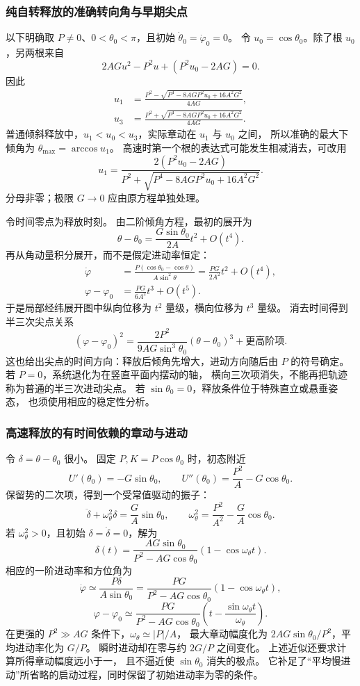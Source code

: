 \documentclass[UTF8,zihao=-4,fontset=fandol,a4paper]{ctexart}
\begin{document}
\subsubsection*{纯自转释放的准确转向角与早期尖点}
以下明确取 $P\ne0$、$0<\theta_0<\pi$，且初始
$\dot\theta_0=\dot\varphi_0=0$。
令 $u_0=\cos\theta_0$。除了根 $u_0$，另两根来自
\[
2AGu^2-P^2u+(P^2u_0-2AG)=0.
\]
因此
\[
\begin{aligned}
u_1&=\frac{P^2-\sqrt{P^4-8AGP^2u_0+16A^2G^2}}{4AG},\\
u_3&=\frac{P^2+\sqrt{P^4-8AGP^2u_0+16A^2G^2}}{4AG}.
\end{aligned}
\]
普通倾斜释放中，$u_1<u_0<u_3$，实际章动在 $u_1$ 与 $u_0$ 之间，
所以准确的最大下倾角为 $\theta_{\max}=\arccos u_1$。
高速时第一个根的表达式可能发生相减消去，可改用
\[
u_1=\frac{2(P^2u_0-2AG)}
{P^2+\sqrt{P^4-8AGP^2u_0+16A^2G^2}}.
\]
分母非零；极限 $G\to0$ 应由原方程单独处理。

令时间零点为释放时刻。
由二阶倾角方程，最初的展开为
\[
\theta-\theta_0=\frac{G\sin\theta_0}{2A}t^2+O(t^4).
\]
再从角动量积分展开，而不是假定进动率恒定：
\[
\begin{aligned}
\dot\varphi&=\frac{P(\cos\theta_0-\cos\theta)}{A\sin^2\theta}
=\frac{PG}{2A^2}t^2+O(t^4),\\
\varphi-\varphi_0&=\frac{PG}{6A^2}t^3+O(t^5).
\end{aligned}
\]
于是局部经纬展开图中纵向位移为 $t^2$ 量级，横向位移为 $t^3$ 量级。
消去时间得到半三次尖点关系
\[
(\varphi-\varphi_0)^2=
\frac{2P^2}{9AG\sin^3\theta_0}(\theta-\theta_0)^3
+\text{更高阶项}.
\]
这也给出尖点的时间方向：释放后倾角先增大，进动方向随后由 $P$ 的符号确定。
若 $P=0$，系统退化为在竖直平面内摆动的轴，
横向三次项消失，不能再把轨迹称为普通的半三次进动尖点。
若 $\sin\theta_0=0$，释放条件位于特殊直立或悬垂姿态，
也须使用相应的稳定性分析。

\subsubsection*{高速释放的有时间依赖的章动与进动}
令 $\delta=\theta-\theta_0$ 很小。
固定 $P,K=P\cos\theta_0$ 时，初态附近
\[
U'(\theta_0)=-G\sin\theta_0,\qquad
U''(\theta_0)=\frac{P^2}{A}-G\cos\theta_0.
\]
保留势的二次项，得到一个受常值驱动的振子：
\[
\ddot\delta+\omega_\theta^2\delta=\frac GA\sin\theta_0,
\qquad
\omega_\theta^2=\frac{P^2}{A^2}-\frac GA\cos\theta_0.
\]
若 $\omega_\theta^2>0$，且初始 $\delta=\dot\delta=0$，解为
\[
\delta(t)=\frac{AG\sin\theta_0}{P^2-AG\cos\theta_0}
(1-\cos\omega_\theta t).
\]
相应的一阶进动率和方位角为
\[
\dot\varphi\simeq\frac{P\delta}{A\sin\theta_0}
=\frac{PG}{P^2-AG\cos\theta_0}(1-\cos\omega_\theta t),
\]
\[
\varphi-\varphi_0\simeq\frac{PG}{P^2-AG\cos\theta_0}
\left(t-\frac{\sin\omega_\theta t}{\omega_\theta}\right).
\]
在更强的 $P^2\gg AG$ 条件下，$\omega_\theta\simeq|P|/A$，
最大章动幅度化为 $2AG\sin\theta_0/P^2$，平均进动率化为 $G/P$。
瞬时进动却在零与约 $2G/P$ 之间变化。
上述近似还要求计算所得章动幅度远小于一，
且不逼近使 $\sin\theta_0$ 消失的极点。
它补足了“平均慢进动”所省略的启动过程，同时保留了初始进动率为零的条件。
\end{document}
